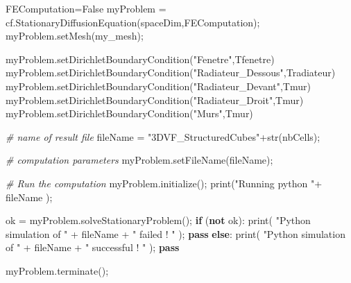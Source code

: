 \documentclass[11pt]{article}
\newenvironment{Shaded}{}{}
\newcommand{\KeywordTok}[1]{\textcolor[rgb]{0.00,0.44,0.13}{\textbf{{#1}}}}
\newcommand{\StringTok}[1]{\textcolor[rgb]{0.25,0.44,0.63}{{#1}}}
\newcommand{\CommentTok}[1]{\textcolor[rgb]{0.38,0.63,0.69}{\textit{{#1}}}}
\newcommand{\NormalTok}[1]{{#1}}
\newcommand{\VariableTok}[1]{\textcolor[rgb]{0.10,0.09,0.49}{{#1}}}
\newcommand{\ControlFlowTok}[1]{\textcolor[rgb]{0.00,0.44,0.13}{\textbf{{#1}}}}
\newcommand{\OperatorTok}[1]{\textcolor[rgb]{0.40,0.40,0.40}{{#1}}}
\newcommand{\BuiltInTok}[1]{{#1}}
\begin{document}
\begin{Shaded}
\begin{Highlighting}[]
\NormalTok{    FEComputation}\OperatorTok{=}\VariableTok{False}
\NormalTok{    myProblem }\OperatorTok{=}\NormalTok{ cf.StationaryDiffusionEquation(spaceDim,FEComputation)}\OperatorTok{;}
\NormalTok{    myProblem.setMesh(my_mesh)}\OperatorTok{;}
    
\NormalTok{    myProblem.setDirichletBoundaryCondition(}\StringTok{"Fenetre"}\NormalTok{,Tfenetre)}
\NormalTok{    myProblem.setDirichletBoundaryCondition(}\StringTok{"Radiateur_Dessous"}\NormalTok{,Tradiateur)}
\NormalTok{    myProblem.setDirichletBoundaryCondition(}\StringTok{"Radiateur_Devant"}\NormalTok{,Tmur)}
\NormalTok{    myProblem.setDirichletBoundaryCondition(}\StringTok{"Radiateur_Droit"}\NormalTok{,Tmur)}
\NormalTok{    myProblem.setDirichletBoundaryCondition(}\StringTok{"Murs"}\NormalTok{,Tmur)}

    \CommentTok{# name of result file}
\NormalTok{    fileName }\OperatorTok{=} \StringTok{"3DVF_StructuredCubes"}\OperatorTok{+}\BuiltInTok{str}\NormalTok{(nbCells)}\OperatorTok{;}

    \CommentTok{# computation parameters}
\NormalTok{    myProblem.setFileName(fileName)}\OperatorTok{;}

    \CommentTok{# Run the computation}
\NormalTok{    myProblem.initialize()}\OperatorTok{;}
    \BuiltInTok{print}\NormalTok{(}\StringTok{"Running python "}\OperatorTok{+}\NormalTok{ fileName )}\OperatorTok{;}

\NormalTok{    ok }\OperatorTok{=}\NormalTok{ myProblem.solveStationaryProblem()}\OperatorTok{;}
    \ControlFlowTok{if}\NormalTok{ (}\KeywordTok{not}\NormalTok{ ok):}
        \BuiltInTok{print}\NormalTok{( }\StringTok{"Python simulation of "} \OperatorTok{+}\NormalTok{ fileName }\OperatorTok{+} \StringTok{"  failed ! "}\NormalTok{ )}\OperatorTok{;}
        \ControlFlowTok{pass}
    \ControlFlowTok{else}\NormalTok{:}
        \BuiltInTok{print}\NormalTok{( }\StringTok{"Python simulation of "} \OperatorTok{+}\NormalTok{ fileName }\OperatorTok{+} \StringTok{"  successful ! "}\NormalTok{ )}\OperatorTok{;}
        \ControlFlowTok{pass}

\NormalTok{    myProblem.terminate()}\OperatorTok{;}
    

\end{Highlighting}
\end{Shaded}
\end{document}
